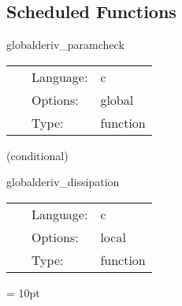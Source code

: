 \documentclass{article}
\begin{document}
\subsection*{Scheduled Functions}
\vspace{5mm}


\hspace{5mm} globalderiv\_paramcheck 

\hspace{5mm}{\it check parameters } 


\hspace{5mm}

 \begin{tabular*}{160mm}{cll} 
~ & Language:  & c \\ 
~ & Options:  & global \\ 
~ & Type:  & function \\ 
\end{tabular*} 


\vspace{5mm}

   (conditional) 

\hspace{5mm} globalderiv\_dissipation 

\hspace{5mm}{\it apply global dissipation to registered variables } 


\hspace{5mm}

 \begin{tabular*}{160mm}{cll} 
~ & Language:  & c \\ 
~ & Options:  & local \\ 
~ & Type:  & function \\ 
\end{tabular*} 



\vspace{5mm}\parskip = 10pt 
\end{document}
